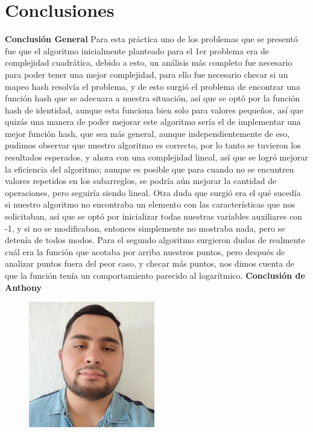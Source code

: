 \documentclass[12pt,twoside]{article}
\begin{document}
\section{Conclusiones}
\textbf{Conclusi\'on General}
\newline
Para esta pr\'actica uno de los problemas que se present\'o fue que el algoritmo inicialmente planteado para el 1er problema era de complejidad cuadr\'atica, debido a esto, un an\'alisis m\'as completo fue necesario para poder tener una mejor complejidad, para ello fue necesario checar si un mapeo hash resolv\'ia el problema, y de esto surgi\'o el problema de encontrar una funci\'on hash 
que se adecuara a nuestra situaci\'on, as\'i que se opt\'o por la funci\'on hash de identidad, aunque esta funciona bien solo para valores pequeños, as\'i que quiz\'as una manera de poder mejorar este algoritmo ser\'ia el de implementar una mejor funci\'on hash, que sea m\'as general, aunque independientemente de eso, pudimos observar que nuestro algoritmo es correcto, por lo tanto se tuvieron los 
resultados esperados, y ahora con una complejidad lineal, as\'i que se logr\'o mejorar la eficiencia del algoritmo; aunque es posible que para cuando no se encuntren valores repetidos en los subarreglos, se podr\'ia a\'un mejorar la cantidad de operaciones, pero seguir\'ia siendo lineal. Otra duda que surgi\'o era el qu\'e suced\'ia si nuestro algoritmo no encontraba un elemento con las caracter\'isticas que nos solicitaban, as\'i que se opt\'o por inicializar todas nuestras variables auxiliares con -1, y si no se modificaban, entonces simplemente no mostraba nada, pero se deten\'ia de todos modos.
Para el segundo algoritmo surgieron dudas de realmente cu\'al era la funci\'on que acotaba por arriba nuestros puntos, pero despu\'es de analizar puntos fuera del peor caso, y checar m\'as puntos, nos dimos cuenta de que la funci\'on ten\'ia un comportamiento parecido al logar\'itmico.
\newpage
\textbf{Conclusi\'on de Anthony}

\begin{figure}
\includegraphics[width=5.5cm]{me.jpg}
\end{figure} 
\end{document}
